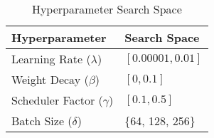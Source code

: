 \begin{table}[!ht]
    \centering
    \caption{Hyperparameter Search Space}
    \label{tab:hyperparameters}
    \begin{tabular}{ll}
    \toprule
    \textbf{Hyperparameter} & \textbf{Search Space} \\
    \midrule
    Learning Rate (\( \lambda \)) & $[0.00001, 0.01]$ \\
    Weight Decay (\( \beta \)) & $[0, 0.1]$ \\
    Scheduler Factor (\(\gamma\)) & $[0.1, 0.5]$ \\
    Batch Size (\(\delta\)) & \{64, 128, 256\} \\
    \bottomrule
    \end{tabular}
\end{table}
